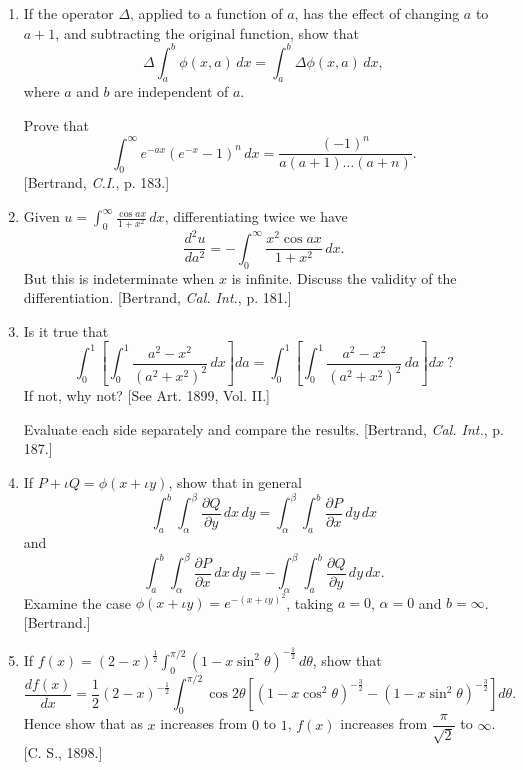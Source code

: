 \documentclass[11pt, a4paper]{article}
\newcommand{\source}[1]{\hfill\textnormal{[#1]}}
\begin{document}
\begin{enumerate}[leftmargin=2em]
(a) \[
\int_0^\infty\frac{\log x}{(a+x)^{n+2}}\,dx=\frac{1}{(n+1)a^{n+1}}\left\{\log a-\frac11-\frac12-\frac13-\dots-\frac1n\right\},
\]

($\beta$) \[
\int_0^\infty\frac{(\log x)^2}{(a+x)^{n+2}}\,dx=\frac{1}{(n+1)a^{n+1}}\left\{\left(\frac{\pi^2}{3}-\frac{1}{1^2}-\frac{1}{2^2}-\frac{1}{3^2}-\dots-\frac{1}{n^2}\right)+\left(\log a-\frac11-\frac12-\frac13-\dots-\frac1n\right)^2\right\}.
\]
\source{Math. Tripos, 1883.}

\item If the operator $\Delta$, applied to a function of $a$, has the effect of changing $a$ to $a+1$, and subtracting the original function, show that
\[
\Delta\int_a^b\phi(x,a)\,dx=\int_a^b\Delta\phi(x,a)\,dx,
\]
where $a$ and $b$ are independent of $a$.

Prove that
\[
\int_0^\infty e^{-ax}(e^{-x}-1)^n\,dx=\frac{(-1)^n}{a(a+1)\dots(a+n)}.
\]
\source{Bertrand, \textit{C.I.}, p. 183.}

\item Given $u=\displaystyle\int_0^\infty\frac{\cos ax}{1+x^2}\,dx$, differentiating twice we have
\[
\frac{d^2u}{da^2}=-\int_0^\infty\frac{x^2\cos ax}{1+x^2}\,dx.
\]
But this is indeterminate when $x$ is infinite. Discuss the validity of the differentiation. \source{Bertrand, \textit{Cal. Int.}, p. 181.}

\item Is it true that
\[
\int_0^1\left[\int_0^1\frac{a^2-x^2}{(a^2+x^2)^2}\,dx\right]da=\int_0^1\left[\int_0^1\frac{a^2-x^2}{(a^2+x^2)^2}\,da\right]dx\ ?
\]
If not, why not? [See Art. 1899, Vol. II.]

Evaluate each side separately and compare the results. \source{Bertrand, \textit{Cal. Int.}, p. 187.}

\item If $P+\iota Q=\phi(x+\iota y)$, show that in general
\[
\int_a^b\int_\alpha^\beta\frac{\partial Q}{\partial y}\,dx\,dy=\int_\alpha^\beta\int_a^b\frac{\partial P}{\partial x}\,dy\,dx
\]
and
\[
\int_a^b\int_\alpha^\beta\frac{\partial P}{\partial x}\,dx\,dy=-\int_\alpha^\beta\int_a^b\frac{\partial Q}{\partial y}\,dy\,dx.
\]
Examine the case $\phi(x+\iota y)=e^{-(x+\iota y)^2}$, taking $a=0$, $\alpha=0$ and $b=\infty$. \source{Bertrand.}

\item If $f(x)=(2-x)^{\frac12}\displaystyle\int_0^{\pi/2}(1-x\sin^2\theta)^{-\frac12}\,d\theta$, show that
\[
\frac{df(x)}{dx}=\frac12(2-x)^{-\frac12}\int_0^{\pi/2}\cos2\theta\left[(1-x\cos^2\theta)^{-\frac32}-(1-x\sin^2\theta)^{-\frac32}\right]d\theta.
\]
Hence show that as $x$ increases from $0$ to $1$, $f(x)$ increases from $\dfrac{\pi}{\sqrt2}$ to $\infty$. \source{C. S., 1898.}


\end{enumerate}
\end{document}
